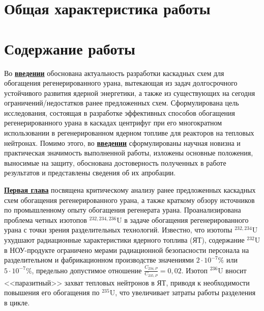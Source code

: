 \section*{Общая характеристика работы}

\newcommand{\actuality}{\underline{\textbf{\actualityTXT}}}
\newcommand{\progress}{\underline{\textbf{\progressTXT}}}
\newcommand{\aim}{\underline{{\textbf\aimTXT}}}
\newcommand{\tasks}{\underline{\textbf{\tasksTXT}}}
\newcommand{\novelty}{\underline{\textbf{\noveltyTXT}}}
\newcommand{\influence}{\underline{\textbf{\influenceTXT}}}
\newcommand{\methods}{\underline{\textbf{\methodsTXT}}}
\newcommand{\defpositions}{\underline{\textbf{\defpositionsTXT}}}
\newcommand{\reliability}{\underline{\textbf{\reliabilityTXT}}}
\newcommand{\probation}{\underline{\textbf{\probationTXT}}}
\newcommand{\contribution}{\underline{\textbf{\contributionTXT}}}
\newcommand{\publications}{\underline{\textbf{\publicationsTXT}}}



\section*{Содержание работы}
Во \underline{\textbf{введении}} обоснована актуальность разработки каскадных схем для обогащения регенерированного урана, вытекающая из задач долгосрочного устойчивого развития ядерной энергетики, а также из существующих на сегодня ограничений/недостатков ранее предложенных схем. Сформулирована цель исследования, состоящая в разработке эффективных способов обогащения регенерированного урана в каскадах центрифуг при его многократном использовании в регенерированном ядерном топливе для реакторов на тепловых нейтронах. Помимо этого, во \underline{\textbf{введении}} сформулированы научная новизна и практическая значимость выполненной работы, изложены основные положения, выносимые на защиту, обоснована достоверность полученных в работе результатов и представлены сведения об их апробации.

\underline{\textbf{Первая глава}} посвящена критическому анализу ранее предложенных каскадных схем обогащения регенерированного урана, а также краткому обзору источников по промышленному опыту обогащения регенерата урана. Проанализирована проблема четных изотопов $^{232,234,236}$U в задаче обогащения регенерированного урана с точки зрения разделительных технологий. Известно, что изотопы $^{232,234}$U ухудшают радиационные характеристики ядерного топлива (ЯТ), содержание $^{232}$U в НОУ-продукте ограничено мерами радиационной безопасности персонала на разделительном и фабрикационном производстве значениями $2\cdot10^{-7} \%$ или $5\cdot10^{-7} \%$, предельно допустимое отношение $\frac{C_{234,{P}}}{C_{235,{P}}} = 0,02$. Изотоп $^{236}$U вносит <<паразитный>> захват тепловых нейтронов в ЯТ, приводя к необходимости повышения его обогащения по $^{235}$U, что увеличивает затраты работы разделения в цикле. 

